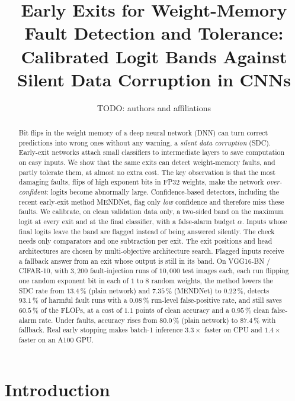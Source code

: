 \documentclass[10pt,a4paper]{article}
\title{Early Exits for Weight-Memory Fault Detection and Tolerance:\\
Calibrated Logit Bands Against Silent Data Corruption in CNNs}
\author{TODO: authors and affiliations}
\date{}
\begin{document}
\maketitle

\begin{abstract}
Bit flips in the weight memory of a deep neural network (DNN) can turn correct predictions into wrong
ones without any warning, a \emph{silent data corruption} (SDC). Early-exit networks attach small
classifiers to intermediate layers to save computation on easy inputs. We show that the same exits can
detect weight-memory faults, and partly tolerate them, at almost no extra cost. The key observation is that the most damaging faults,
flips of high exponent bits in FP32 weights, make the network \emph{over-confident}: logits become
abnormally large. Confidence-based detectors, including the recent early-exit method MENDNet, flag only
\emph{low} confidence and therefore miss these faults. We calibrate, on clean validation data only, a
two-sided band on the maximum logit at every exit and at the final classifier, with a false-alarm budget
$\alpha$. Inputs whose final logits leave the band are flagged instead of being answered silently. The
check needs only comparators and one subtraction per exit. The exit positions and head architectures are
chosen by multi-objective architecture search. Flagged inputs receive a fallback answer from an exit
whose output is still in its band. On VGG16-BN / CIFAR-10, with $3{,}200$ fault-injection runs of
$10{,}000$ test images each, each run flipping one random exponent bit in each of $1$ to $8$ random
weights, the method lowers the SDC rate from $13.4\,\%$ (plain network) and
$7.35\,\%$ (MENDNet) to $0.22\,\%$, detects $93.1\,\%$ of harmful fault runs with a $0.08\,\%$ run-level
false-positive rate, and still saves $60.5\,\%$ of the FLOPs, at a cost of $1.1$ points of clean
accuracy and a $0.95\,\%$ clean false-alarm rate. Under faults, accuracy rises from $80.0\,\%$ (plain
network) to $87.4\,\%$ with fallback. Real early stopping makes batch-1 inference
$3.3\times$ faster on CPU and $1.4\times$ faster on an A100 GPU.
\end{abstract}

\section{Introduction}
\end{document}
